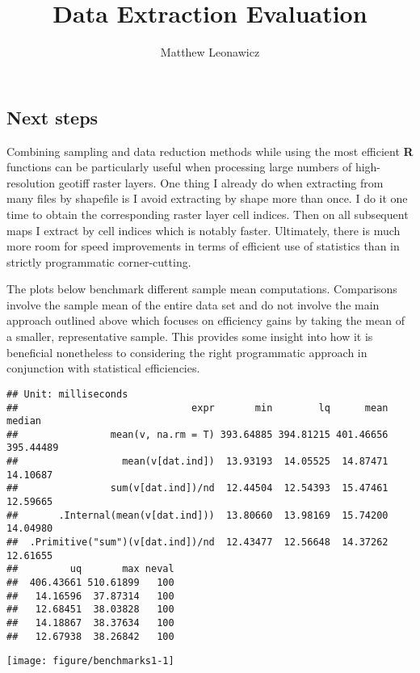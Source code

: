 \documentclass{article}\usepackage[]{graphicx}\usepackage[]{color}
\makeatletter
\def\maxwidth{ %
  \ifdim\Gin@nat@width>\linewidth
    \linewidth
  \else
    \Gin@nat@width
  \fi
}
\newenvironment{kframe}{%
 \def\at@end@of@kframe{}%
 \ifinner\ifhmode%
  \def\at@end@of@kframe{\end{minipage}}%
  \begin{minipage}{\columnwidth}%
 \fi\fi%
 \def\FrameCommand##1{\hskip\@totalleftmargin \hskip-\fboxsep
 \colorbox{shadecolor}{##1}\hskip-\fboxsep
     \hskip-\linewidth \hskip-\@totalleftmargin \hskip\columnwidth}%
 \MakeFramed {\advance\hsize-\width
   \@totalleftmargin\z@ \linewidth\hsize
   \@setminipage}}%
 {\par\unskip\endMakeFramed%
 \at@end@of@kframe}
\newenvironment{knitrout}{}{} %
\makeatother
\begin{document}
\title{Data Extraction Evaluation}
\author{Matthew Leonawicz}
\maketitle





\subsection{Next steps}

Combining sampling and data reduction methods while using the most efficient \textbf{R} functions can be particularly useful when processing large numbers of high-resolution geotiff raster layers.
One thing I already do when extracting from many files by shapefile is I avoid extracting by shape more than once.
I do it one time to obtain the corresponding raster layer cell indices.
Then on all subsequent maps I extract by cell indices which is notably faster.
Ultimately, there is much more room for speed improvements in terms of efficient use of statistics than in strictly programmatic corner-cutting.

The plots below benchmark different sample mean computations.
Comparisons involve the sample mean of the entire data set and do not involve the main approach outlined above which focuses on efficiency gains by taking the mean of a smaller, representative sample.
This provides some insight into how it is beneficial nonetheless to considering the right programmatic approach in conjunction with statistical efficiencies.

\begin{knitrout}
\color{fgcolor}\begin{kframe}
\begin{verbatim}
## Unit: milliseconds
##                              expr       min        lq      mean    median
##                mean(v, na.rm = T) 393.64885 394.81215 401.46656 395.44489
##                  mean(v[dat.ind])  13.93193  14.05525  14.87471  14.10687
##                sum(v[dat.ind])/nd  12.44504  12.54393  15.47461  12.59665
##       .Internal(mean(v[dat.ind]))  13.80660  13.98169  15.74200  14.04980
##  .Primitive("sum")(v[dat.ind])/nd  12.43477  12.56648  14.37262  12.61655
##         uq       max neval
##  406.43661 510.61899   100
##   14.16596  37.87314   100
##   12.68451  38.03828   100
##   14.18867  38.37634   100
##   12.67938  38.26842   100
\end{verbatim}
\end{kframe}
\texttt{[image: figure/benchmarks1-1]} 

\end{knitrout}
\end{document}
